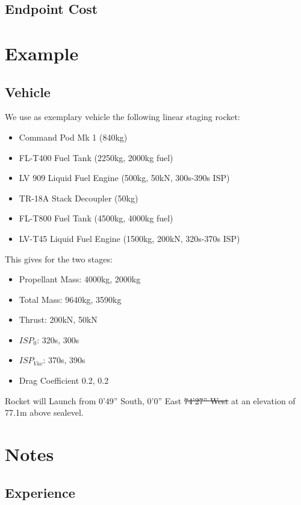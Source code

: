 \documentclass[11pt]{report}
\begin{document}
\section{Endpoint Cost}

\chapter{Example}

\section{Vehicle}

We use as exemplary vehicle the following linear staging rocket:

\begin{itemize}
\item Command Pod Mk 1 (840kg)
\item FL-T400 Fuel Tank (2250kg, 2000kg fuel)
\item LV 909 Liquid Fuel Engine (500kg, 50kN, 300s-390s ISP)
\item TR-18A Stack Decoupler (50kg)
\item FL-T800 Fuel Tank (4500kg, 4000kg fuel)
\item LV-T45 Liquid Fuel Engine (1500kg, 200kN, 320s-370s ISP)
\end{itemize}

This gives for the two stages:

\begin{itemize}
\item Propellant Mass: 4000kg, 2000kg
\item Total Mass: 9640kg, 3590kg
\item Thrust: 200kN, 50kN
\item $ISP_0$: 320s, 300s
\item $ISP_{Vac}$: 370s, 390s
\item Drag Coefficient 0.2, 0.2
\end{itemize}

Rocket will Launch from 0'49'' South, 0'0''
East \sout{74'27'' West} at an elevation of 77.1m above
sealevel.

\chapter{Notes}

\section{Experience}
\end{document}

